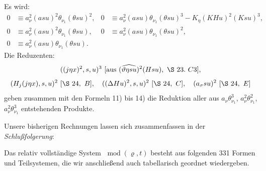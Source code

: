 \documentclass[11pt]{article}
\newcommand{\D}{\Delta}
\newcommand{\R}{\varrho}
\newcommand{\modu}[1]{\;\operatorname{mod} #1}
\providecommand{\modu}[1]{\;\operatorname{mod} #1}
\begin{document}
Es wird:
\begin{align*}
0&\equiv a_\nu^2(asu)^2\theta_{\nu_1}(\theta su)^2,
&0&\equiv a_\nu^2(asu)\theta_{\nu_1}(\theta su)^3-K_\eta(KHu)^2(Ksu)^3,\\
0&\equiv a_\nu^2(asu)^2\theta_{\nu_1}(\theta su),
&0&\equiv a_\nu^2(asu)\theta_{\nu_1}(\theta su)^2,\\
0&\equiv a_\nu^2(asu)\theta_{\nu_1}(\theta su).
\end{align*}
Die Reduzenten:
\[
 ((j\eta x)^2,s,u)^3\ [\hbox{aus }(\widehat{\vartheta\eta su})^2(Hsu),\ \S\ 23.\ C3],
\]
\[
(H_j(j\eta x),s,u)^2\ [\S\ 24,\ B],
\quad ((\D Hu)^2,s,u)^2\ [\S\ 24,\ C],
\quad (a_\sigma su)^2\ [\S\ 24,\ E]
\]
geben zusammen mit den Formeln 11) bis 14) die Reduktion aller aus $a_\nu\theta_{\nu_1}^3$, $a_\nu^2\theta_{\nu_1}^2$, $a_\nu^2\theta_{\nu_1}^3$ entstehenden Produkte.

Unsere bisherigen Rechnungen lassen sich zusammenfassen in der \emph{Schlußfolgerung}:

Das relativ vollständige System $\modu{(\R,t)}$ besteht aus folgenden 331 Formen und Teilsystemen, die wir anschließend auch tabellarisch geordnet wiedergeben.
\end{document}
